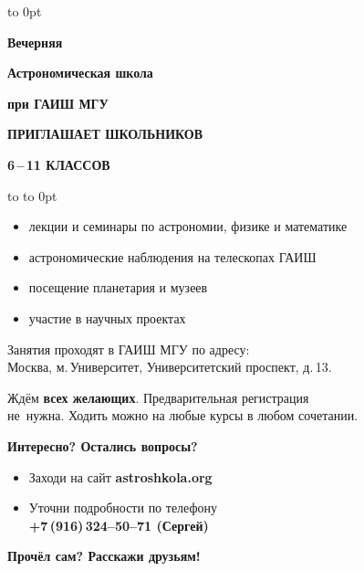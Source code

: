 \documentclass[a5paper,12pt]{article}
\begin{document}
\vbox to 0pt{%
}%
\vskip44pt
\centerline{\Large\textbf{Вечерняя}}
\vskip6pt
\centerline{\huge\textbf{Астрономическая школа}}
\vskip6pt
\centerline{\large\textbf{при ГАИШ МГУ}}
\vskip9pt
\centerline{\Large\textsf{\textbf{ПРИГЛАШАЕТ ШКОЛЬНИКОВ}}}
\vskip 9pt
\centerline{\Large\textsf{\textbf{6\,--\,11 КЛАССОВ}}}
\vskip12pt
\hbox to 
\vskip-24pt\hbox to 0pt{}

{\large%
\begin{itemize}
\setlength{\itemsep}{-4pt}
\setlength{\parindent}{0pt}
\item лекции и семинары по астрономии, физике и математике
\item астрономические наблюдения на телескопах ГАИШ
\item посещение планетария и музеев
\item участие в научных проектах
\end{itemize}


Занятия проходят в ГАИШ МГУ по адресу:\\Москва, м.\,Университет,
Университетский проспект, д.\,13.

\bigskip

Ждём \textbf{всех желающих}. Предварительная регистрация\\
не~нужна. Ходить можно на любые курсы в любом сочетании.

\vskip12pt

\textsf{\textbf{Интересно? Остались вопросы?}}
\begin{itemize}
\setlength{\itemsep}{-4pt}
\item Заходи на сайт \textbf{astroshkola.org}
\item Уточни подробности по телефону\\
\textbf{+7\,(916)\,324--50--71 (Сергей)}
\end{itemize}

\textsf{\textbf{Прочёл сам? Расскажи друзьям!}}

}%
\end{document}
